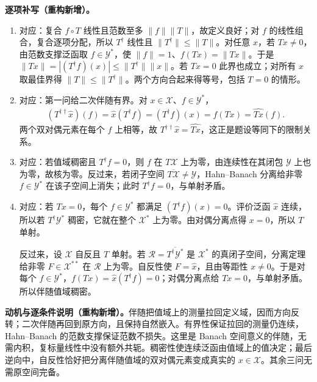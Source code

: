 \documentclass[../../main.tex]{subfiles}
\begin{document}
\begin{solution}
\textbf{逐项补写（重构新增）。}
\begin{enumerate}
\item 对应：复合 $f\circ T$ 线性且范数至多 $\|f\|\|T\|$，故定义良好；对 $f$ 的线性组合，复合逐项分配，所以 $T^\dagger$ 线性且 $\|T^\dagger\|\le\|T\|$。对任意 $x$，若 $Tx\ne0$，由范数支撑泛函取 $f\in\mathcal Y^*$，使 $\|f\|=1$、$f(Tx)=\|Tx\|$。于是 $\|Tx\|=|(T^\dagger f)(x)|\le\|T^\dagger\|\|x\|$。若 $Tx=0$ 此界也成立；对所有 $x$ 取最佳界得 $\|T\|\le\|T^\dagger\|$。两个方向合起来得等号，包括 $T=0$ 的情形。
\item 对应：第一问给二次伴随有界。对 $x\in\mathcal X$、$f\in\mathcal Y^*$，
\begin{align*}
(T^{\dagger\dagger}\widehat x)(f)=\widehat x(T^\dagger f)=(T^\dagger f)(x)=f(Tx)=\widehat{Tx}(f).
\end{align*}
两个双对偶元素在每个 $f$ 上相等，故 $T^{\dagger\dagger}\widehat x=\widehat{Tx}$，这正是题设等同下的限制关系。
\item 对应：若值域稠密且 $T^\dagger f=0$，则 $f$ 在 $T\mathcal X$ 上为零，由连续性在其闭包 $\mathcal Y$ 上也为零，故核为零。反过来，若闭子空间 $\overline{T\mathcal X}\ne\mathcal Y$，Hahn--Banach 分离给非零 $f\in\mathcal Y^*$ 在该子空间上消失；此时 $T^\dagger f=0$，与单射矛盾。
\item 对应：若 $Tx=0$，每个 $f\in\mathcal Y^*$ 都满足 $(T^\dagger f)(x)=0$。评价泛函 $\widehat x$ 连续，所以若 $T^\dagger\mathcal Y^*$ 稠密，它就在整个 $\mathcal X^*$ 上为零。由对偶分离点得 $x=0$，所以 $T$ 单射。

反过来，设 $\mathcal X$ 自反且 $T$ 单射。若 $\mathcal R=\overline{T^\dagger\mathcal Y^*}$ 是 $\mathcal X^*$ 的真闭子空间，分离定理给非零 $F\in\mathcal X^{**}$ 在 $\mathcal R$ 上为零。自反性使 $F=\widehat x$，且由等距性 $x\ne0$。于是对每个 $f\in\mathcal Y^*$，$f(Tx)=\widehat x(T^\dagger f)=0$；对偶分离点给 $Tx=0$，与单射矛盾。所以伴随值域稠密。
\end{enumerate}
\end{solution}
\begin{remark}
\textbf{动机与逐条件说明（重构新增）。}伴随把值域上的测量拉回定义域，因而方向反转；二次伴随再回到原方向，且保持自然嵌入。有界性保证拉回的测量仍连续，Hahn--Banach 的范数支撑保证范数不损失。这里是 Banach 空间意义的伴随，无需内积，复标量线性中没有额外共轭。稠密性使连续泛函由值域上的值决定；最后逆向中，自反性恰好把分离伴随值域的双对偶元素变成真实的 $x\in\mathcal X$。其余三问无需原空间完备。
\end{remark}
\end{document}
